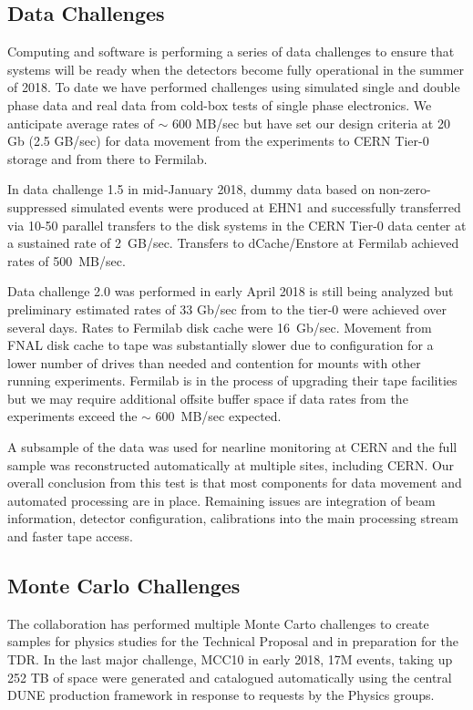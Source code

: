 \subsection{Data Challenges}

Computing and software is performing a series of data challenges to ensure that systems will be ready when the detectors become fully operational in the summer of 2018.  To date we have performed challenges using simulated single and double phase data and real data from cold-box tests of single phase electronics.   We anticipate average rates of $\sim$ 600 MB/sec but have set our design criteria at 20 Gb (2.5 GB/sec) for data movement from the experiments to CERN Tier-0 storage and from there to Fermilab. 

In data challenge 1.5 in mid-January 2018, dummy data based on non-zero-suppressed simulated events were produced at EHN1 and successfully transferred via 10-50 parallel transfers to the  disk systems in the CERN Tier-0 data center at a sustained rate of 2~GB/sec.    Transfers to dCache/Enstore at Fermilab achieved rates of 500~MB/sec.  

Data challenge 2.0 was performed in early April 2018 is still being analyzed but preliminary estimated  rates of 33 Gb/sec from  to the tier-0 were achieved over several days. Rates to Fermilab disk cache were 16~Gb/sec.  Movement from FNAL disk cache to tape was substantially slower due to configuration for a lower number of drives than needed and contention for mounts with other running experiments.   Fermilab is in the process of upgrading their tape facilities but we may require additional offsite buffer space if data rates from the experiments exceed the $\sim$ 600~MB/sec expected. 

A subsample of the data was used for nearline monitoring at CERN and the full sample was reconstructed automatically at multiple sites, including CERN. 
Our overall conclusion from this test is that most components for data movement and automated processing are in place.  Remaining issues are integration of beam information, detector configuration, calibrations into the main processing stream and faster tape access. 

\subsection{Monte Carlo Challenges}
The collaboration has performed multiple Monte Carto challenges to create samples for physics studies for the Technical Proposal and in preparation for the TDR.  In the last major challenge,  MCC10 in early 2018, 17M events, taking up 252 TB of space were generated and catalogued automatically using the central DUNE production framework in response to requests by the Physics groups. 

